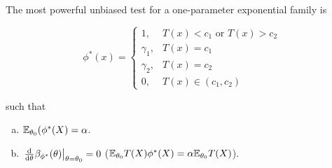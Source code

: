 \begin{theorem}

The most powerful unbiased test for a one-parameter exponential family is 

\[
\phi^*(x) = \begin{cases}
1, & T(x) < c_1 \text{ or } T(x) > c_2 \\
\gamma_1, & T(x) = c_1 \\
\gamma_2, & T(x) = c_2 \\
0, & T(x) \in (c_1, c_2)
\end{cases}
\]

such that 

\begin{enumerate}[(a)]

\item \(\E_{\theta_0}(\phi^*(X) = \alpha\).

\item \( \left. \deriv{}{\theta} \beta_{\phi^*}(\theta) \right|_{\theta = \theta_0} = 0\)  (\(\E_{\theta_0} T(X) \phi^*(X) = \alpha \E_{\theta_0} T(X)\)).

\end{enumerate}



\end{theorem}

